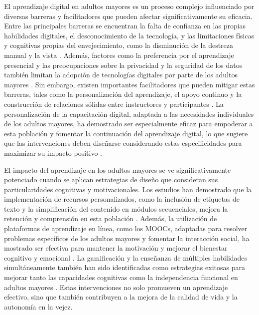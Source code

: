 El aprendizaje digital en adultos mayores es un proceso complejo influenciado por diversas barreras y facilitadores que pueden afectar significativamente su eficacia. Entre las principales barreras se encuentran la falta de confianza en las propias habilidades digitales, el desconocimiento de la tecnología, y las limitaciones físicas y cognitivas propias del envejecimiento, como la disminución de la destreza manual y la vista \cite{wilson-menzfeld_learning_2023, harris_older_2022}. Además, factores como la preferencia por el aprendizaje presencial y las preocupaciones sobre la privacidad y la seguridad de los datos también limitan la adopción de tecnologías digitales por parte de los adultos mayores \cite{Keohane_barriers_2022}. Sin embargo, existen importantes facilitadores que pueden mitigar estas barreras, tales como la personalización del aprendizaje, el apoyo continuo y la construcción de relaciones sólidas entre instructores y participantes \cite{wilson-menzfeld_learning_2023}. La personalización de la capacitación digital, adaptada a las necesidades individuales de los adultos mayores, ha demostrado ser especialmente eficaz para empoderar a esta población y fomentar la continuación del aprendizaje digital, lo que sugiere que las intervenciones deben diseñarse considerando estas especificidades para maximizar su impacto positivo \cite{wilson-menzfeld_learning_2023,gedvilaite-kordusiene_digital_2023}.

El impacto del aprendizaje en los adultos mayores se ve significativamente potenciado cuando se aplican estrategias de diseño que consideran sus particularidades cognitivas y motivacionales. Los estudios han demostrado que la implementación de recursos personalizados, como la inclusión de etiquetas de texto y la simplificación del contenido en módulos secuenciales, mejora la retención y comprensión en esta población \cite{pappas_cognitive-based_2019, song_developing_2024}. Además, la utilización de plataformas de aprendizaje en línea, como los MOOCs, adaptadas para resolver problemas específicos de los adultos mayores y fomentar la interacción social, ha mostrado ser efectiva para mantener la motivación y mejorar el bienestar cognitivo y emocional \cite{xiong_older_2019}. La gamificación y la enseñanza de múltiples habilidades simultáneamente también han sido identificadas como estrategias exitosas para mejorar tanto las capacidades cognitivas como la independencia funcional en adultos mayores \cite{leanos_impact_2023,kappen_design_2016}. Estas intervenciones no solo promueven un aprendizaje efectivo, sino que también contribuyen a la mejora de la calidad de vida y la autonomía en la vejez.

